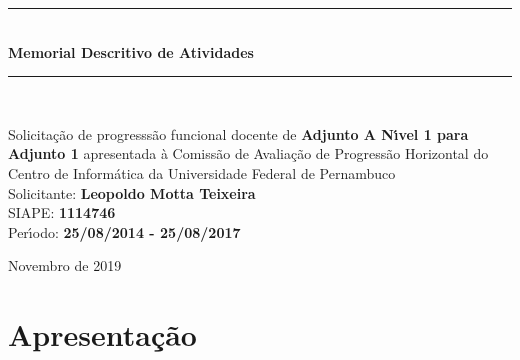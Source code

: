 \documentclass[a4paper,oneside,10pt]{article}
\begin{document}
\begin{titlepage}

\vspace{-5.0cm}


\begin{center}
\vspace{1cm}
\rule{1.0\textwidth}{1pt} \\ [0.5cm]
{\Huge \textbf{\textsf{Memorial Descritivo de Atividades}}} \\
\rule{1.0\textwidth}{1pt} \\
\vspace{2cm}

\doublespacing
{\Large \textsf{Solicita\c{c}\~{a}o de progresss\~{a}o funcional docente de \textbf{Adjunto A N\'{\i}vel 1 para Adjunto 1} apresentada \`{a} Comiss\~{a}o de Avalia\c{c}\~{a}o de Progress\~{a}o Horizontal do Centro de Inform\'{a}tica da Universidade Federal de Pernambuco}}\\
\vspace{1.5cm}
{\LARGE \textsf{Solicitante: \textbf{Leopoldo Motta Teixeira}}}\\
\vspace{0.5cm}
{\Large \textsf{SIAPE: \textbf{1114746}}} \\
\vspace{0.5cm}
{\Large \textsf{Per\'{\i}odo: \textbf{25/08/2014 - 25/08/2017}}} \\

\vspace{2.0cm}

\normalsize \textsf{Novembro de 2019}

\end{center}
\thispagestyle{empty}
\end{titlepage}


\tableofcontents


\newpage
\section*{Apresenta\c{c}\~{a}o}
\vspace{0.3cm}
\end{document}
